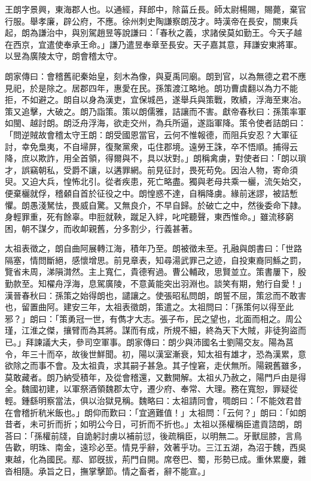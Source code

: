 
\begin{pinyinscope}
王朗字景興，東海郡人也。以通經，拜郎中，除菑丘長。師太尉楊賜，賜薨，棄官行服。舉孝廉，辟公府，不應。徐州刺史陶謙察朗茂才。時漢帝在長安，關東兵起，朗為謙治中，與別駕趙昱等說謙曰：「春秋之義，求諸侯莫如勤王。今天子越在西京，宜遣使奉承王命。」謙乃遣昱奉章至長安。天子嘉其意，拜謙安東將軍。以昱為廣陵太守，朗會稽太守。

朗家傳曰：會稽舊祀秦始皇，刻木為像，與夏禹同廟。朗到官，以為無德之君不應見祀，於是除之。居郡四年，惠愛在民。孫策渡江略地。朗功曹虞翻以為力不能拒，不如避之。朗自以身為漢吏，宜保城邑，遂舉兵與策戰，敗績，浮海至東冶。策又追擊，大破之。朗乃詣策。策以朗儒雅，詰讓而不害。獻帝春秋曰：孫策率軍如閩、越討朗。朗泛舟浮海，欲走交州，為兵所逼，遂詣軍降。策令使者詰朗曰：「問逆賊故會稽太守王朗：朗受國恩當官，云何不惟報德，而阻兵安忍？大軍征討，幸免梟夷，不自埽屏，復聚黨衆，屯住郡境。遠勞王誅，卒不悟順。捕得云降，庶以欺詐，用全首領，得爾與不，具以狀對。」朗稱禽虜，對使者曰：「朗以瑣才，誤竊朝私，受爵不讓，以遘罪網。前見征討，畏死苟免。因治人物，寄命須臾。又迫大兵，惶怖北引。從者疾患，死亡略盡。獨與老母共乘一欐，流矢始交，便棄欐就俘，稽顙自首於征役之中。朗惶惑不達，自稱降虜。緣前迷謬，被詰慙懼。朗愚淺駑怯，畏威自驚。又無良介，不早自歸。於破亡之中，然後委命下隷。身輕罪重，死有餘辜。申脰就鞅，蹴足入絆，叱咤聽聲，東西惟命。」雖流移窮困，朝不謀夕，而收卹親舊，分多割少，行義甚著。

太祖表徵之，朗自曲阿展轉江海，積年乃至。朗被徵未至。孔融與朗書曰：「世路隔塞，情問斷絕，感懷增思。前見章表，知尋湯武罪己之迹，自投東裔同鯀之罰，覽省未周，涕隕潸然。主上寬仁，貴德宥過。曹公輔政，思賢並立。策書屢下，殷勤款至。知櫂舟浮海，息駕廣陵，不意黃能突出羽淵也。談笑有期，勉行自愛！」漢晉春秋曰：孫策之始得朗也，譴讓之。使張昭私問朗，朗誓不屈，策忿而不敢害也，留置曲阿。建安三年，太祖表徵朗，策遣之。太祖問曰：「孫策何以得至此邪？」朗曰：「策勇冠一世，有儁才大志。張子布，民之望也，北面而相之。周公瑾，江淮之傑，攘臂而為其將。謀而有成，所規不細，終為天下大賊，非徒狗盜而已。」拜諫議大夫，參司空軍事。朗家傳曰：朗少與沛國名士劉陽交友。陽為莒令，年三十而卒，故後世鮮聞。初，陽以漢室漸衰，知太祖有雄才，恐為漢累，意欲除之而事不會。及太祖貴，求其嗣子甚急。其子惶窘，走伏無所。陽親舊雖多，莫敢藏者。朗乃納受積年，及從會稽還，又數開解。太祖乆乃赦之，陽門戶由是得全。魏國初建，以軍祭酒領魏郡太守，遷少府、奉常、大理。務在寬恕，罪疑從輕。鍾繇明察當法，俱以治獄見稱。魏略曰：太祖請同會，啁朗曰：「不能效君昔在會稽折秔米飯也。」朗仰而歎曰：「宜適難值！」太祖問：「云何？」朗曰：「如朗昔者，未可折而折；如明公今日，可折而不折也。」太祖以孫權稱臣遣貢諮朗，朗荅曰：「孫權前牋，自詭躬討虜以補前愆，後疏稱臣，以明無二。牙獸屈膝，言鳥告歡，明珠、南金，遠珍必至。情見乎辭，效著乎功。三江五湖，為沼于魏，西吳東越，化為國民。鄢、郢旣拔，荊門自開。席卷巴、蜀，形勢已成。重休累慶，雜沓相隨。承旨之日，撫掌擊節。情之畜者，辭不能宣。」


\end{pinyinscope}
